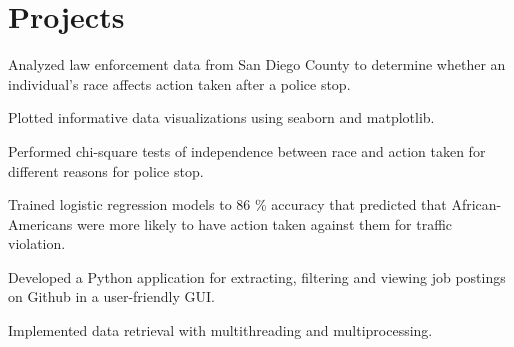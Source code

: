 \documentclass[]{deedy-resume-openfont}
\begin{document}
\begin{minipage}[t]{0.66\textwidth}


\section{Projects}

\begin{tightemize}
\item Analyzed law enforcement data from San Diego County to determine whether an individual's race affects action taken after a police stop.
\item Plotted informative data visualizations using seaborn and matplotlib.
\item Performed chi-square tests of independence between race and action taken for different reasons for police stop.
\item Trained logistic regression models to 86 \% accuracy that predicted that African-Americans were more likely to have action taken against them for traffic violation. 
\end{tightemize}

\sectionsep


\begin{tightemize}
\item Developed a Python application for extracting, filtering and viewing job postings on Github in a user-friendly GUI. 
\item Implemented data retrieval with multithreading and multiprocessing.
\end{tightemize}


\end{minipage}
\end{document}

